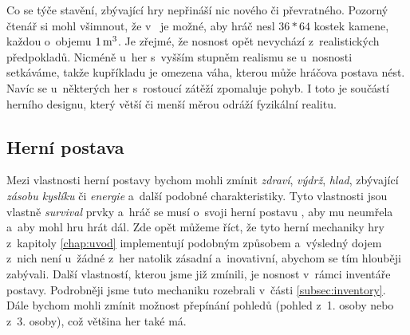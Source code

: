Co se týče stavění, zbývající hry nepřináší nic nového či převratného. Pozorný čtenář si mohl všimnout, že v~ je možné, aby hráč nesl $36*64$ kostek kamene, každou o~objemu $1\,\rm m^3$. Je zřejmé, že nosnost opět nevychází z~realistických předpokladů. Nicméně u~her s~vyšším stupněm realismu se u~nosnosti setkáváme, takže kupříkladu je omezena váha, kterou může hráčova postava nést. Navíc se u~některých her s~rostoucí zátěží zpomaluje pohyb. I toto je součástí herního designu, který větší či menší měrou odráží fyzikální realitu.

\subsection{Herní postava}
Mezi vlastnosti herní postavy bychom mohli zmínit \textit{zdraví}, \textit{výdrž}, \textit{hlad}, zbývající \textit{zásobu kyslíku} či \textit{energie} a~další podobné charakteristiky. Tyto vlastnosti jsou vlastně \textit{survival} prvky a~hráč se musí o~svoji herní postavu , aby mu neumřela a~aby mohl hru hrát dál. Zde opět můžeme říct, že tyto herní mechaniky hry z~kapitoly \ref{chap:uvod} implementují podobným způsobem a~výsledný dojem z~nich není u~žádné z~her natolik zásadní a~inovativní, abychom se tím hlouběji zabývali.
Další vlastností, kterou jsme již zmínili, je nosnost v~rámci inventáře postavy. Podrobněji jsme tuto mechaniku rozebrali v~části \ref{subsec:inventory}. 
Dále bychom mohli zmínit možnost přepínání pohledů (pohled z~1. osoby nebo z~3. osoby), což většina her také má. 


